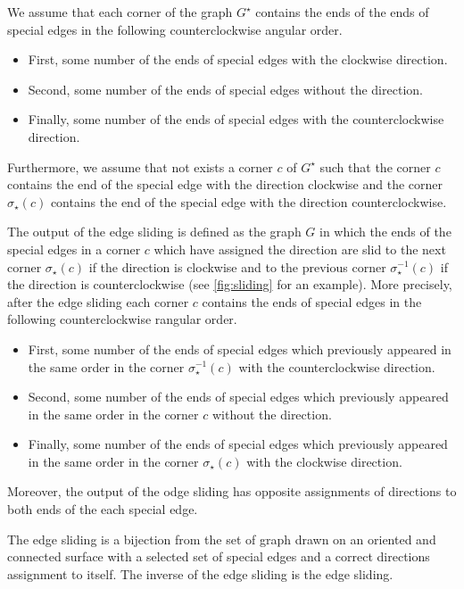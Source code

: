 \documentclass[submission]{FPSAC2021}
\DeclareMathOperator{\res}{\star}
\begin{document}
We assume that each corner of the 
graph $G^{\res}$ contains the ends 
of the ends of special edges in the 
following  counterclockwise angular 
order.  
\begin{itemize}

\item First, some number of the 
		ends of special edges 
		with the clockwise 
		direction.

\item Second, some number of the 
		ends of special edges 
		without the direction. 
\item Finally, some number of the
		ends of special edges with 
		the counterclockwise 
		direction. 
\end{itemize}  
Furthermore, we assume that not exists a 
corner $c$ of $G^{\res}$ such that the corner 
$c$ contains the end of the special 
edge with the direction clockwise and 
the corner $\sigma_{\res}(c)$ contains the end 
of the  special edge with the direction 
counterclockwise.

The output of the edge sliding is defined 
as the graph $G$ in which the ends of the 
special edges in a corner $c$ which have 
assigned the direction are slid to the 
next corner $\sigma_{\res}(c)$ if the direction 
is clockwise and to the previous corner 
$\sigma_{\res}^{-1}(c)$ if the direction is 
counterclockwise (see \cref{fig:sliding} 
for an example). More precisely, after 
the edge sliding each corner $c$ contains 
the ends of special edges in the following 
counterclockwise rangular order.  
\begin{itemize}

\item First, some number of the ends 
		of special edges which 
		previously appeared in the 
		same order in the corner 
		$\sigma_{\res}^{-1}(c)$
		with the counterclockwise 
		direction.
\item Second, some number of the ends 
		of special edges which 
		previously appeared in the 
		same order in the corner $c$
		without the direction. 
\item Finally, some number of the ends 
		of special edges which previously 
		appeared in the same order 
		in the corner $\sigma_{\res}(c)$
		with the clockwise direction.
\end{itemize}  
Moreover, the output of the odge sliding
has opposite assignments of directions to
both ends of the each special edge.

The edge sliding is a bijection from the 
set of graph drawn on an oriented and 
connected surface with a selected set of 
special edges and a correct directions 
assignment to itself. The inverse of the 
edge sliding is the edge sliding.  
\end{document}
